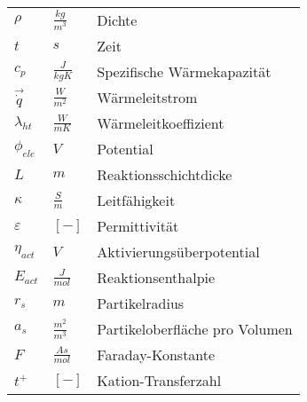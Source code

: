 \begin{tabularx}{15.1cm}{llX}
	$\rho$ & $\frac{kg}{m^{3}}$ & Dichte\\ [0.1cm]
	$t$ & $s$ & Zeit\\ [0.1cm]
	$c_{p}$ & $\frac{J}{kgK}$ & Spezifische Wärmekapazität\\ [0.1cm]
	$\vec{\dot{q}}$ & $\frac{W}{m^{2}}$ & Wärmeleitstrom\\ [0.1cm]
	$\lambda_{ht}$ & $\frac{W}{mK}$ & Wärmeleitkoeffizient\\ [0.1cm]
	$\phi_{ele}$ & $V$ & Potential\\ [0.1cm]
	$L$ & $m$ & Reaktionsschichtdicke\\ [0.1cm]
	$\kappa$ & $\frac{S}{m}$ & Leitfähigkeit\\ [0.1cm]
	$\varepsilon$ & $[-]$ & Permittivität\\ [0.1cm]
	$\eta_{act}$ & $V$ & Aktivierungsüberpotential\\ [0.1cm]
	$E_{act}$ & $\frac{J}{mol}$ & Reaktionsenthalpie\\ [0.1cm]
	$r_{s}$ & $m$ & Partikelradius\\ [0.1cm]
	$a_{s}$ & $\frac{m^{2}}{m^{3}}$ & Partikeloberfläche pro Volumen\\ [0.1cm]
	$F$ & $\frac{As}{mol}$ & Faraday-Konstante\\ [0.1cm]
	$t^{+}$ & $[-]$ & Kation-Transferzahl\\ [0.1cm]
\end{tabularx}	

